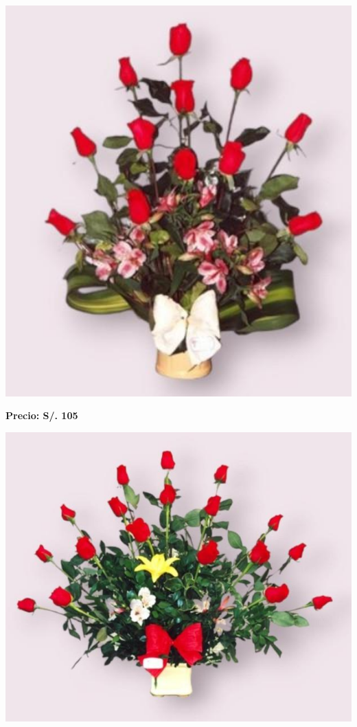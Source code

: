 \documentclass{article}
\begin{document}
\begin{minipage}{0.35\textwidth}
    \includegraphics[width=1.0\textwidth]{imagenes_extraidas/image_10_3}
\end{minipage}
\vspace{0.3cm}
\begin{center}
   \textbf{\Large Precio: \textcolor{cpred}{S/. 105 }}
\end{center}
\vspace{1cm}
\noindent
\begin{minipage}{0.35\textwidth}
    \includegraphics[width=1.0\textwidth]{imagenes_extraidas/image_10_4}
\end{minipage}
\end{document}
